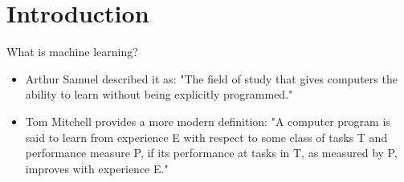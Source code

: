 \section{Introduction}

\begin{frame}{What is machine learning?}
    \begin{itemize}
        \item Arthur Samuel described it as: "The field of study that gives computers the ability to learn without being explicitly programmed."
        \item Tom Mitchell provides a more modern definition: "A computer program is said to learn from experience E with respect to some class of tasks T and performance measure P, if its performance at tasks in T, as measured by P, improves with experience E."
    \end{itemize}
\end{frame}

